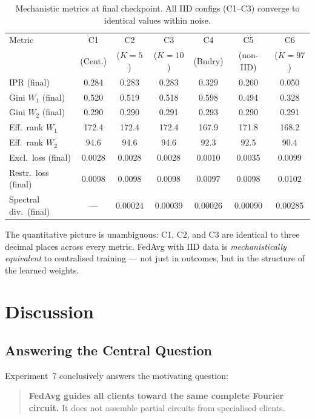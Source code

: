 \documentclass{article}
\begin{document}
\begin{table}[h]
\centering
\caption{Mechanistic metrics at final checkpoint.  All IID configs (C1--C3)
converge to identical values within noise.}
\label{tab:exp7_summary}
\small
\begin{tabular}{@{}lcccccc@{}}
\toprule
Metric & C1 & C2 & C3 & C4 & C5 & C6 \\
       & (Cent.) & ($K{=}5$) & ($K{=}10$) & (Bndry) & (non-IID) & ($K{=}97$) \\
\midrule
IPR (final)             & 0.284 & 0.283 & 0.283 & 0.329 & 0.260 & 0.050 \\
Gini $W_1$ (final)      & 0.520 & 0.519 & 0.518 & 0.598 & 0.494 & 0.328 \\
Gini $W_2$ (final)      & 0.290 & 0.290 & 0.291 & 0.293 & 0.290 & 0.291 \\
Eff.\ rank $W_1$        & 172.4 & 172.4 & 172.4 & 167.9 & 171.8 & 168.2 \\
Eff.\ rank $W_2$        & 94.6  & 94.6  & 94.6  & 92.3  & 92.5  & 90.4 \\
Excl.\ loss (final)     & 0.0028 & 0.0028 & 0.0028 & 0.0010 & 0.0035 & 0.0099 \\
Restr.\ loss (final)    & 0.0098 & 0.0098 & 0.0098 & 0.0097 & 0.0098 & 0.0102 \\
Spectral div.\ (final)  & ---   & 0.00024 & 0.00039 & 0.00026 & 0.00090 & 0.00285 \\
\bottomrule
\end{tabular}
\end{table}

The quantitative picture is unambiguous: C1, C2, and C3 are identical to
three decimal places across every metric.  FedAvg with IID data is
\emph{mechanistically equivalent} to centralised training --- not just in
outcomes, but in the structure of the learned weights.

\section{Discussion}

\subsection{Answering the Central Question}

Experiment~7 conclusively answers the motivating question:

\begin{quote}
\textbf{FedAvg guides all clients toward the same complete Fourier circuit.}
It does not assemble partial circuits from specialised clients.
\end{quote}
\end{document}
